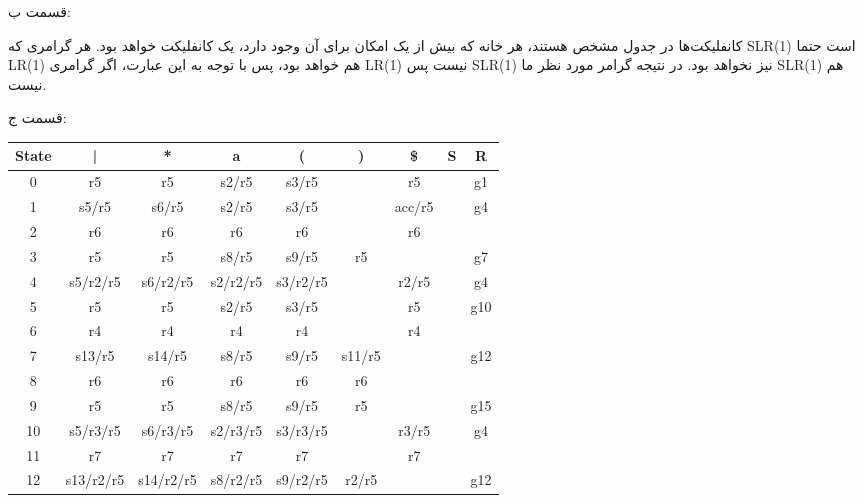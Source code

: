 قسمت ب:

کانفلیکت‌ها در جدول مشخص هستند، هر خانه که بیش از یک امکان برای آن وجود دارد، یک کانفلیکت خواهد بود.
هر گرامری که SLR(1) است حتما LR(1) هم خواهد بود، پس با توجه به این عبارت، اگر گرامری LR(1) نیست پس SLR(1) نیز نخواهد بود.
در نتیجه گرامر مورد نظر ما SLR(1) هم نیست.

قسمت ج:

\begin{center}
    \begin{latin}
    \begin{tabular}{|c|c|c|c|c|c|c|c|c|}
    \hline
    State  & |        & *        & a        & (        & )        & \$        & S        & R \\ \hline
    0      & r5       & r5       &s2/r5     &s3/r5     &          &r5         &          & g1\\ \hline
    1      &s5/r5     &s6/r5     &s2/r5     &s3/r5     &          &acc/r5     &          & g4\\ \hline
    2      &r6        &r6        &r6        &r6        &          &r6         &          &   \\ \hline
    3      &r5        &r5        &s8/r5     &s9/r5     &r5        &           &          & g7\\ \hline
    4      &s5/r2/r5  &s6/r2/r5  &s2/r2/r5  &s3/r2/r5  &          &r2/r5      &          & g4\\ \hline
    5      &r5        &r5        &s2/r5     &s3/r5     &          &r5         &          &g10\\ \hline
    6      &r4        &r4        &r4        &r4        &          &r4         &          &   \\ \hline
    7      &s13/r5    &s14/r5    &s8/r5     &s9/r5     &s11/r5    &           &          &g12\\ \hline
    8      &r6        &r6        &r6        &r6        &r6        &           &          &   \\ \hline
    9      &r5        &r5        &s8/r5     &s9/r5     &r5        &           &          &g15\\ \hline
    10     &s5/r3/r5  &s6/r3/r5  &s2/r3/r5  &s3/r3/r5  &          &r3/r5      &          & g4\\ \hline
    11     &r7        &r7        &r7        &r7        &          &r7         &          &   \\ \hline
    12     &s13/r2/r5 &s14/r2/r5 &s8/r2/r5  &s9/r2/r5  &r2/r5     &           &          &g12\\ \hline

\end{tabular}
\end{latin}
\end{center}
